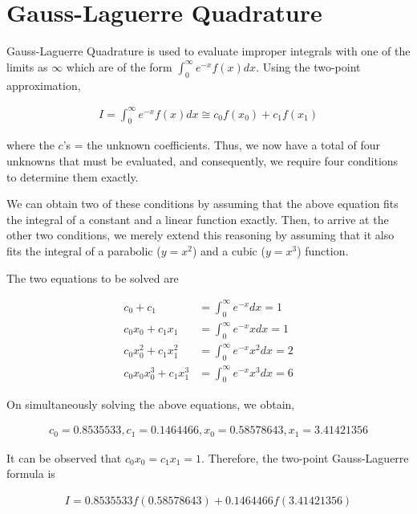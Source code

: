 \documentclass[book.tex]{subfiles}
\begin{document}
\section{Gauss-Laguerre Quadrature}
Gauss-Laguerre Quadrature is used to evaluate improper integrals with one of the limits as $\infty$ which are of the form $\int_{0}^{\infty}e^{-x}f(x)dx$. Using the two-point approximation, 

\begin{align}
I = \int_{0}^{\infty}e^{-x}f(x)dx \cong c_0f(x_0) + c_1f(x_1)
\end{align} 

where the $c$’s = the unknown coefficients. Thus, we now have a total of four unknowns that must be evaluated, and consequently, we require four conditions to determine them exactly.

We can obtain two of these conditions by assuming that the above equation fits the integral of a constant and a linear function exactly. Then, to arrive at the other two conditions, we merely extend this reasoning by assuming that it also fits the integral of a parabolic ($y = x^2$) and a cubic ($y = x^3$) function.

The two equations to be solved are

\begin{align}
	c_0 + c_1 &= \int_{0}^{\infty}e^{-x}dx = 1 \\
	c_0x_0 + c_1x_1 &= \int_{0}^{\infty}e^{-x}xdx = 1\\
	c_0x_0^2 + c_1x_1^2 &= \int_{0}^{\infty}e^{-x}x^2dx = 2 \\
	c_0x_0x_0^3 + c_1x_1^3 &= \int_{0}^{\infty}e^{-x}x^3dx = 6
\end{align}

On simultaneously solving the above equations, we obtain,

\begin{align}
c_0 = 0.8535533, c_1 = 0.1464466, x_0 = 0.58578643, x_1 = 3.41421356
\end{align}

It can be observed that $c_0x_0 = c_1x_1 = 1$. Therefore, the two-point Gauss-Laguerre formula is

\begin{align}
I = 0.8535533f(0.58578643) + 0.1464466f(3.41421356)
\end{align}
%
%
%
\end{document}
